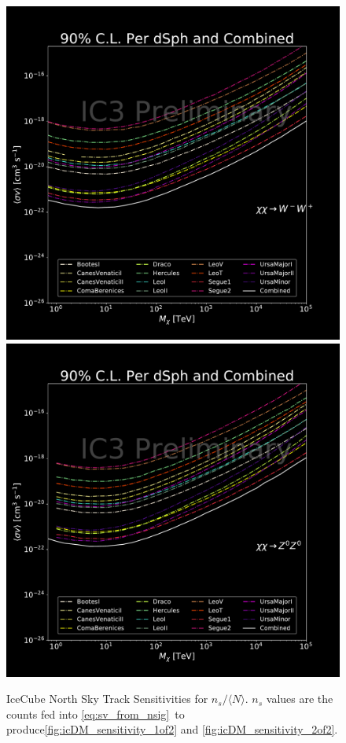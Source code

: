 \begin{figure}[h!]
{        \includegraphics[scale=0.265]{figures/ic_DM/dm_plots/WW_money_plot_comb.pdf}
        \includegraphics[scale=0.265]{figures/ic_DM/dm_plots/ZZ_money_plot_comb.pdf}
    }
    \caption{IceCube North Sky Track Sensitivities for $n_s / \langle N \rangle$. $n_s$ values are the counts fed into \cref{eq:sv_from_nsig}~to produce\cref{fig:icDM_sensitivity_1of2} and \cref{fig:icDM_sensitivity_2of2}.}
    \label{fig:icDM_NSsensitivity_1of2}
\end{figure}


